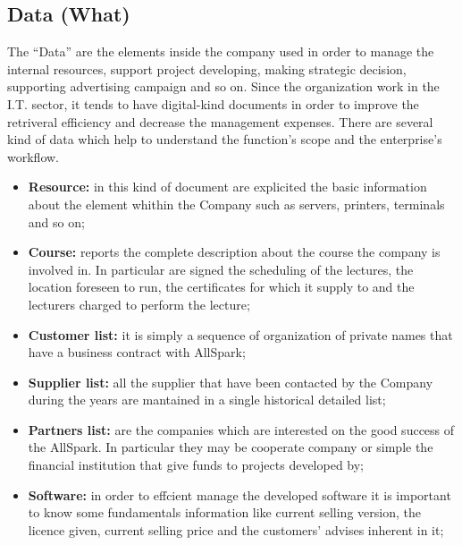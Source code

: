 \subsection{Data (What)}
\label{subsec:scope[Data]}
The ``Data'' are the elements inside the company used in order to manage the internal resources, support project developing, making strategic decision, supporting advertising campaign and so on. Since the organization work in the I.T. sector, it tends to have digital-kind documents in order to improve the retriveral efficiency and decrease the management expenses. There are several kind of data which help to understand the function's scope and the enterprise's workflow.
\begin{itemize}
  \item {\bf Resource:} in this kind of document are explicited the basic information about the element whithin the Company such as servers, printers, terminals and so on;
  \item {\bf Course:} reports the complete description about the course the company is involved in. In particular are signed the scheduling of the lectures, the location foreseen to run, the certificates for which it supply to and the lecturers charged to perform the lecture;
  \item {\bf Customer list:} it is simply a sequence of organization of private names that have a business contract with AllSpark;
  \item {\bf Supplier list:} all the supplier that have been contacted by the Company during the years are mantained in a single historical detailed list;
  \item {\bf Partners list:} are the companies which are interested on the good success of the AllSpark. In particular they may be cooperate company or simple the financial institution that give funds to projects developed by;
  \item {\bf Software:} in order to effcient manage the developed software it is important to know some fundamentals information like current selling version, the licence given, current selling price and the customers' advises inherent in it;

\end{itemize}
